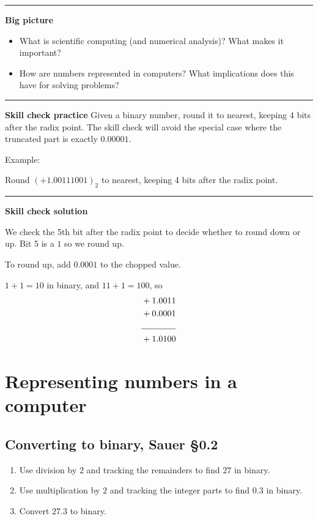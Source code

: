 \documentclass[12pt,letterpaper,noanswers]{exam}
\begin{document}
\hrule
\vspace{0.2cm}


\noindent\textbf{Big picture}
\begin{itemize}
    \itemsep0pt
\item What is scientific computing (and numerical analysis)?  What makes it important?

\item How are numbers represented in computers?  What implications does this have for solving problems?
\end{itemize}

\vspace{0.2cm}
\hrule
\vspace{0.2cm}

\noindent \textbf{Skill check practice}
Given a binary number, round it to nearest, keeping 4 bits after the radix point.  The skill check will avoid the special case where the truncated part is exactly $0.00001$.

\noindent Example:

Round $(+1.00111001)_2$ to nearest, keeping 4 bits after the radix point. 


\vspace{0.2cm}
\hrule
\vspace{0.2cm}

\noindent \textbf{Skill check solution}

We check the 5th bit after the radix point to decide whether to round down or up.  Bit 5 is a $1$ so we round up.  

To round up, add $0.0001$ to the chopped value.

$1 + 1 = 10$ in binary, and $11 + 1 = 100$, so 
\begin{align*}
    &+1.0011 \\
    &+0.0001 \\
    \cline{1-2}
     &+1.0100
\end{align*}
\section{Representing numbers in a computer}

\subsection{Converting to binary, Sauer \S 0.2}
\begin{enumerate}[resume]
\itemsep60pt
    \item Use division by $2$ and tracking the remainders to find $27$ in binary.
    \item Use multiplication by $2$ and tracking the integer parts to find $0.3$ in binary.
    \item Convert $27.3$ to binary.

    \end{enumerate}
\end{document}
